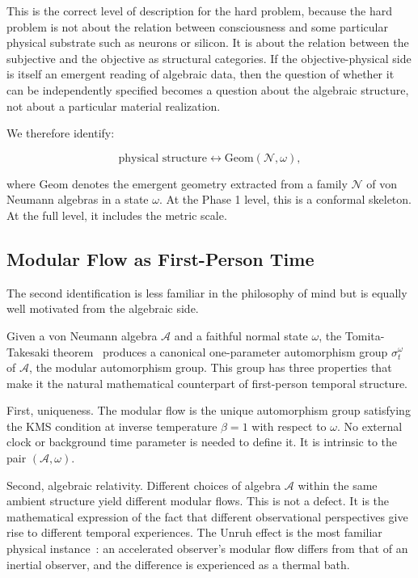 \documentclass[12pt]{article}
\theoremstyle{definition}
\theoremstyle{remark}
\begin{document}
This is the correct level of description for the hard problem, because
the hard problem is not about the relation between consciousness and
some particular physical substrate such as neurons or silicon. It is
about the relation between the subjective and the objective as
structural categories. If the objective-physical side is itself an
emergent reading of algebraic data, then the question of whether it can
be independently specified becomes a question about the algebraic
structure, not about a particular material realization.

We therefore identify:

\[
\text{physical structure} \longleftrightarrow \mathrm{Geom}(\mathcal{N},\omega),
\]

where \(\mathrm{Geom}\) denotes the emergent geometry extracted from a
family \(\mathcal{N}\) of von Neumann algebras in a state \(\omega\). At
the Phase 1 level, this is a conformal skeleton. At the full level, it
includes the metric scale.

\subsection{Modular Flow as First-Person
Time}\label{modular-flow-as-first-person-time}

The second identification is less familiar in the philosophy of mind but
is equally well motivated from the algebraic side.

Given a von Neumann algebra \(\mathcal{A}\) and a faithful normal state
\(\omega\), the Tomita-Takesaki theorem~\cite{Takesaki2003} produces a canonical
one-parameter automorphism group \(\sigma_t^\omega\) of \(\mathcal{A}\),
the modular automorphism group. This group has three properties that
make it the natural mathematical counterpart of first-person temporal
structure.

First, uniqueness. The modular flow is the unique automorphism group
satisfying the KMS condition at inverse temperature \(\beta = 1\) with
respect to \(\omega\). No external clock or background time parameter is
needed to define it. It is intrinsic to the pair
\((\mathcal{A},\omega)\).

Second, algebraic relativity. Different choices of algebra
\(\mathcal{A}\) within the same ambient structure yield different
modular flows. This is not a defect. It is the mathematical expression
of the fact that different observational perspectives give rise to
different temporal experiences. The Unruh effect is the most familiar
physical instance~\cite{Unruh1976}: an accelerated observer's modular flow differs from
that of an inertial observer, and the difference is experienced as a
thermal bath.
\end{document}
